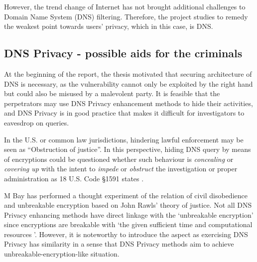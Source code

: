 However, the trend change of Internet has not brought additional challenges to Domain Name System (DNS) filtering. Therefore, the project studies to remedy the weakest point towards users' privacy, which in this case, is DNS.

\subsection{DNS Privacy - possible aids for the criminals}
At the beginning of the report, the thesis motivated that securing architecture of DNS is necessary, as the vulnerability cannot only be exploited by the right hand but could also be misused by a malevolent party.
It is feasible that the perpetrators may use DNS Privacy enhancement methods to hide their activities, and DNS Privacy is in good practice that makes it difficult for investigators to eavesdrop on queries.

In the U.S. or common law jurisdictions, hindering lawful enforcement may be seen as ``Obstruction of justice''.
In this perspective, hiding DNS query by means of encryptions could be questioned whether such behaviour is \textit{concealing} or \textit{covering up} with the intent to \textit{impede} or \textit{obstruct} the investigation or proper administration as 18 U.S. Code \S 1591 states \cite{Obstructionofjustice}.

M Bay has performed a thought experiment of the relation of civil disobedience and unbreakable encryption \cite{bay2017ethics} based on John Rawls' theory of justice.
Not all DNS Privacy enhancing methods have direct linkage with the `unbreakable encryption' since encryptions are breakable with `the given sufficient time and computational resources \cite{ellison2000ten,chau2006application}'.
However, it is noteworthy to introduce the aspect as exercising DNS Privacy has similarity in a sense that DNS Privacy methods aim to achieve unbreakable-encryption-like situation.

